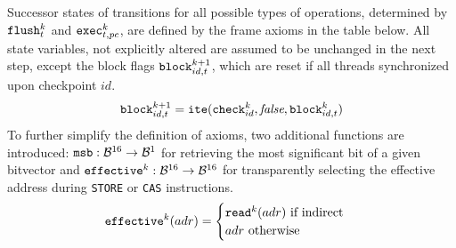 \noindent
Successor states of transitions for all possible types of operations, determined by $\FLUSH^k_t$ and $\EXEC^k_{t, pc}$, are defined by the frame axioms in the table below.
All state variables, not explicitly altered are assumed to be unchanged in the next step, except the block flags $\BLOCK^{k + 1}_{id, t}$, which are reset if all threads synchronized upon checkpoint $id$.
\[
  \BLOCK^{k + 1}_{id, t} = \ITE(\CHECK^k_{id}, \FALSE, \BLOCK^k_{id, t})
\]
To further simplify the definition of axioms, two additional functions are introduced:
$\MSB: \BVSORT \to \BVSORT[1]$ for retrieving the most significant bit of a given bitvector and $\EFFECTIVE^k: \BVSORT \to \BVSORT$ for transparently selecting the effective address during \lstinline[language={[concubine]Assembler}]{STORE} or \lstinline[language={[concubine]Assembler}]{CAS} instructions.
\[
  \EFFECTIVE^k(adr) =
  \begin{cases}
    \READ^k(adr) \text{ if indirect} \\
    adr \text{ otherwise}
  \end{cases}
\]



